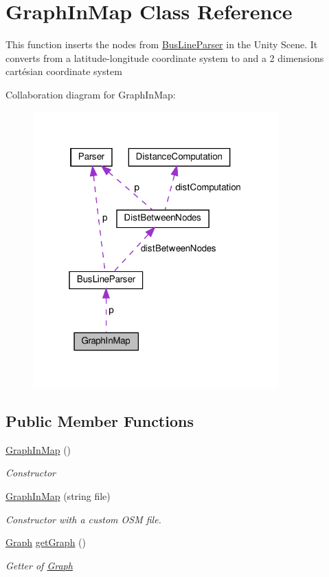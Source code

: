\hypertarget{classGraphInMap}{}\section{Graph\+In\+Map Class Reference}
\label{classGraphInMap}


This function inserts the nodes from {\ttfamily \hyperlink{classBusLineParser}{Bus\+Line\+Parser}} in the Unity Scene. It converts from a latitude-\/longitude coordinate system to and a 2 dimensions cartésian coordinate system  




Collaboration diagram for Graph\+In\+Map\+:\nopagebreak
\begin{figure}[H]
\begin{center}
\leavevmode
\includegraphics[width=268pt]{classGraphInMap__coll__graph}
\end{center}
\end{figure}
\subsection*{Public Member Functions}
\begin{DoxyCompactItemize}
\item 
\hyperlink{classGraphInMap_ae90bf398b6c8d18784d8d01f28ad1da0}{Graph\+In\+Map} ()
\begin{DoxyCompactList}\small\item\em Constructor \end{DoxyCompactList}\item 
\hyperlink{classGraphInMap_ac9b024f6f816f9451702f1b9a829aa0a}{Graph\+In\+Map} (string file)
\begin{DoxyCompactList}\small\item\em Constructor with a custom O\+SM file. \end{DoxyCompactList}\item 
\hyperlink{classGraph}{Graph} \hyperlink{classGraphInMap_a399e9c51b1492837c7d71b9a729a84ad}{get\+Graph} ()
\begin{DoxyCompactList}\small\item\em Getter of {\ttfamily \hyperlink{classGraph}{Graph}} \end{DoxyCompactList}\end{DoxyCompactItemize}
